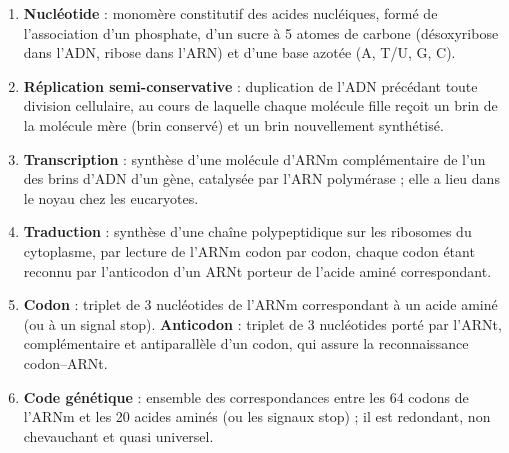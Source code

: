 \documentclass[11pt]{article}
\begin{document}
\begin{corrige}
\begin{enumerate}
\item \textbf{Nucléotide} : monomère constitutif des acides nucléiques, formé de l'association d'un phosphate, d'un sucre à 5 atomes de carbone (désoxyribose dans l'ADN, ribose dans l'ARN) et d'une base azotée (A, T/U, G, C).
\item \textbf{Réplication semi-conservative} : duplication de l'ADN précédant toute division cellulaire, au cours de laquelle chaque molécule fille reçoit un brin de la molécule mère (brin conservé) et un brin nouvellement synthétisé.
\item \textbf{Transcription} : synthèse d'une molécule d'ARNm complémentaire de l'un des brins d'ADN d'un gène, catalysée par l'ARN polymérase ; elle a lieu dans le noyau chez les eucaryotes.
\item \textbf{Traduction} : synthèse d'une chaîne polypeptidique sur les ribosomes du cytoplasme, par lecture de l'ARNm codon par codon, chaque codon étant reconnu par l'anticodon d'un ARNt porteur de l'acide aminé correspondant.
\item \textbf{Codon} : triplet de 3 nucléotides de l'ARNm correspondant à un acide aminé (ou à un signal stop). \textbf{Anticodon} : triplet de 3 nucléotides porté par l'ARNt, complémentaire et antiparallèle d'un codon, qui assure la reconnaissance codon--ARNt.
\item \textbf{Code génétique} : ensemble des correspondances entre les 64 codons de l'ARNm et les 20 acides aminés (ou les signaux stop) ; il est redondant, non chevauchant et quasi universel.
\end{enumerate}
\end{corrige}
\end{document}
